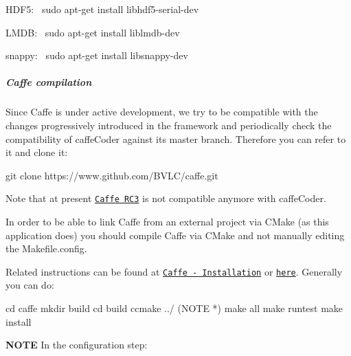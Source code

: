 H\+D\+F5\+:~\newline
 {\ttfamily sudo apt-\/get install libhdf5-\/serial-\/dev}

L\+M\+DB\+:~\newline
 {\ttfamily sudo apt-\/get install liblmdb-\/dev}

snappy\+:~\newline
 {\ttfamily sudo apt-\/get install libsnappy-\/dev}

\subparagraph*{Caffe compilation}

Since Caffe is under active development, we try to be compatible with the changes progressively introduced in the framework and periodically check the compatibility of {\ttfamily caffe\+Coder} against its {\ttfamily master} branch. Therefore you can refer to it and clone it\+:


\begin{DoxyCode}
git clone https://www.github.com/BVLC/caffe.git
\end{DoxyCode}


Note that at present \href{https://github.com/BVLC/caffe/releases}{\tt Caffe R\+C3} is not compatible anymore with {\ttfamily caffe\+Coder}.

In order to be able to link Caffe from an external project via C\+Make (as this application does) you should compile Caffe via C\+Make and not manually editing the Makefile.\+config.

Related instructions can be found at \href{http://caffe.berkeleyvision.org/installation.html}{\tt Caffe -\/ Installation} or \href{https://github.com/BVLC/caffe/pull/1667}{\tt here}. Generally you can do\+:


\begin{DoxyCode}
cd caffe
mkdir build
cd build
ccmake ../ (NOTE *)
make all
make runtest
make install
\end{DoxyCode}


{\bfseries N\+O\+TE} In the configuration step\+:


